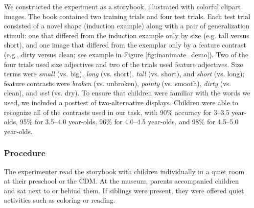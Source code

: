 \documentclass[man]{apa2}
\begin{document}
We constructed the experiment as a storybook, illustrated with colorful clipart images. The book contained two training trials and four test trials. Each test trial consisted of a novel shape (induction example) along with a pair of generalization stimuli: one that differed from the induction example only by size (e.g. tall versus short), and one image that differed from the exemplar only by a feature contrast (e.g., dirty versus clean; see example in Figure \ref{fig:inanimate_demo}). Two of the four trials used size adjectives and two of the trials used feature adjectives.
Size terms were \emph{small} (vs. big), \emph{long} (vs. short), \emph{tall} (vs. short), and \emph{short} (vs. long);  feature contrasts were \emph{broken} (vs. unbroken), \emph{pointy} (vs. smooth), \emph{dirty} (vs. clean), and \emph{wet} (vs. dry).  To ensure that children were familiar with the words we used, we included a posttest of two-alternative displays.  Children were able to recognize all of the contrasts used in our task, with 90\% accuracy for 3--3.5 year-olds, 95\% for 3.5--4.0 year-olds, 96\% for 4.0--4.5 year-olds, and 98\% for 4.5--5.0 year-olds.  

\subsubsection{Procedure}

The experimenter read the storybook with children individually in a quiet room at their preschool or the CDM.  At the museum, parents accompanied children and sat next to or behind them.  If siblings were present, they were offered quiet activities such as coloring or reading.
\end{document}
